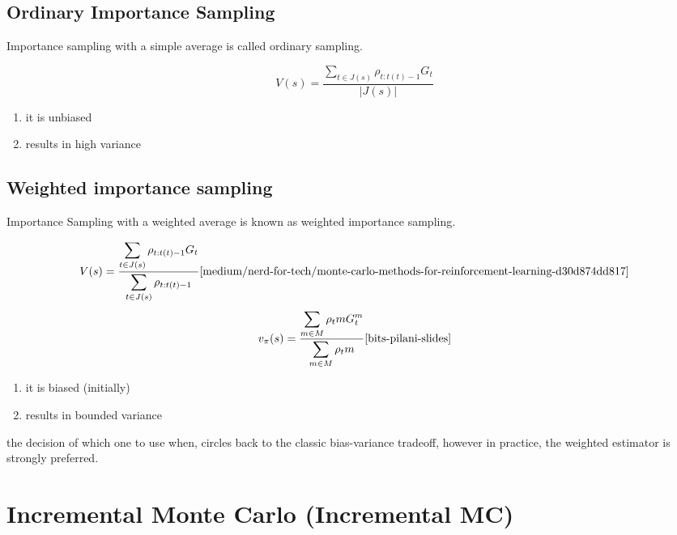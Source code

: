 \subsection{Ordinary Importance Sampling \cite{medium/nerd-for-tech/monte-carlo-methods-for-reinforcement-learning-d30d874dd817}}\label{RL: Ordinary Importance Sampling}

Importance sampling with a simple average is called ordinary sampling.

\[
    V(s) = \displaystyle\dfrac{\displaystyle\sum_{t\in J(s)} \rho_{t:t(t)-1}G_t}{|J(s)|}
\]

\begin{enumerate}
    \item it is unbiased
    \item results in high variance
\end{enumerate}

\subsection{Weighted importance sampling \cite{medium/nerd-for-tech/monte-carlo-methods-for-reinforcement-learning-d30d874dd817}}\label{RL: Weighted importance sampling}

Importance Sampling with a weighted average is known as weighted importance sampling.

\[
    V(s) = \displaystyle\dfrac{\displaystyle\sum_{t\in J(s)} \rho_{t:t(t)-1}G_t}{\displaystyle\sum_{t\in J(s)} \rho_{t:t(t)-1}} \hfill \text{\cite{medium/nerd-for-tech/monte-carlo-methods-for-reinforcement-learning-d30d874dd817}}
\]
\[
    v_\pi(s) = \displaystyle\dfrac{\displaystyle\sum_{m\in M} \rho_t m G_t^m}{\displaystyle\sum_{m\in M} \rho_t m} \hfill \text{\cite{bits-pilani-slides}}
\]

\begin{enumerate}
    \item it is biased (initially)
    \item results in bounded variance
\end{enumerate}

the decision of which one to use when, circles back to the classic bias-variance tradeoff, however in practice, the 
weighted estimator is strongly preferred.

\section{Incremental Monte Carlo (Incremental MC) \cite{redirect.cs.umbc.edu/courses/graduate/678/fall21/RL05}} \label{RL: Incremental Monte Carlo (Incremental MC)}

